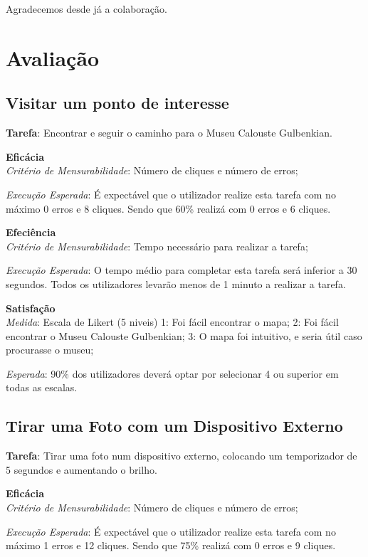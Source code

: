 \documentclass[a4paper]{article}
\begin{document}
  Agradecemos desde já a colaboração.

  \section{Avaliação}

  \subsection{Visitar um ponto de interesse}
  \textbf{Tarefa}: Encontrar e seguir o caminho para o Museu
  Calouste Gulbenkian.

  \textbf{Eficácia}\\
  \textit{Critério de Mensurabilidade}: Número de cliques e
  número de erros;

  \textit{Execução Esperada}: É expectável que o utilizador
  realize esta tarefa com no máximo 0 erros e 8 cliques.
  Sendo que 60\% realizá com 0 erros e 6 cliques.

  \textbf{Efeciência}\\
  \textit{Critério de Mensurabilidade}: Tempo necessário para
  realizar a tarefa;

  \textit{Execução Esperada}: O tempo médio para completar esta
  tarefa será inferior a 30 segundos. Todos os utilizadores levarão
  menos de 1 minuto a realizar a tarefa.

  \textbf{Satisfação}\\
  \textit{Medida}: Escala de Likert (5 niveis)
  1: Foi fácil encontrar o mapa;
  2: Foi fácil encontrar o Museu Calouste Gulbenkian;
  3: O mapa foi intuitivo, e seria útil caso procurasse o museu;

  \textit{Esperada}: 90\% dos utilizadores deverá optar por selecionar
  4 ou superior em todas as escalas.

  \subsection{Tirar uma Foto com um Dispositivo Externo}
  \textbf{Tarefa}: Tirar uma foto num dispositivo externo,
  colocando um temporizador de 5 segundos e aumentando o brilho.

  \textbf{Eficácia}\\
  \textit{Critério de Mensurabilidade}: Número de cliques e
  número de erros;

  \textit{Execução Esperada}: É expectável que o utilizador
  realize esta tarefa com no máximo 1 erros e 12 cliques.
  Sendo que 75\% realizá com 0 erros e 9 cliques.
\end{document}
